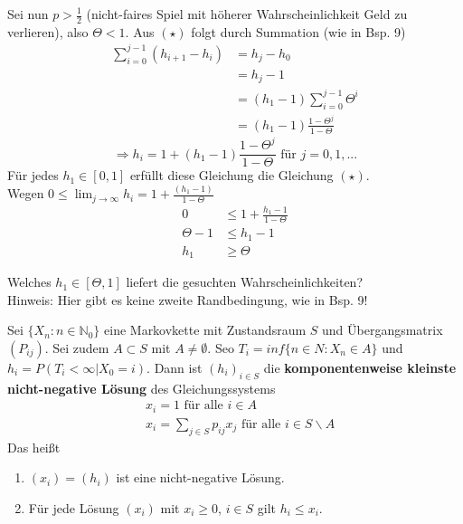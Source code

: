 \documentclass[a4paper,12pt]{article}
\begin{document}
\begin{tcolorbox}[breakable, colframe=blue, colback=white, title=Beispiel 10]
Sei nun $p > \frac{1}{2}$ (nicht-faires Spiel mit höherer Wahrscheinlichkeit Geld zu verlieren), also $\Theta < 1$.
Aus $(\star)$ folgt durch Summation (wie in Bsp. 9)
\begin{align*}
\sum_{i=0}^{j-1}(h_{i+1} - h_i) & = h_j - h_0 \\
& = h_j - 1 \\
& = (h_1-1)\sum_{i=0}^{j-1}\Theta^{i}\\
& = (h_1 - 1)\frac{1- \Theta^{j}}{1- \Theta}
\end{align*}
$$
\Rightarrow h_i = 1 + (h_1 - 1)\frac{1- \Theta^{j}}{1- \Theta} \text{ für } j = 0, 1, ...
$$
Für jedes $h_1 \in [0,1]$ erfüllt diese Gleichung die Gleichung $(\star)$.\\
Wegen $0 \leq \lim_{j \to \infty}h_i = 1 + \frac{(h_1 - 1)}{1 - \Theta}$ 
\begin{align*}
0 &\leq 1+ \frac{h_1 - 1}{1- \Theta}\\
\Theta - 1 & \leq h_1 - 1 \\
h_1 &\geq \Theta
\end{align*}


Welches $h_1 \in [\Theta, 1]$ liefert die gesuchten Wahrscheinlichkeiten?\\

Hinweis: Hier gibt es keine zweite Randbedingung, wie in Bsp. 9!
\end{tcolorbox}


\begin{tcolorbox}[breakable, colframe=green, colback=white, title=Satz 11]
Sei $\{X_n: n \in \mathbb{N}_0\}$ eine Markovkette mit Zustandsraum $S$ und Übergangsmatrix $(P_{ij})$.
Sei zudem $A \subset S$ mit $A \neq \emptyset$. Seo $T_i = inf\{n \in N: X_n \in A\}$ und
$h_i = P(T_i < \infty | X_0 = i)$.  Dann ist $(h_i)_{i \in S}$ die \textbf{komponentenweise kleinste nicht-negative Lösung} 
des Gleichungssystems
\begin{align*}
	&x_i = 1 \text{ für alle } i \in A\\
	&x_i = \sum_{j \in S}p_{ij}x_j \text{ für alle } i \in S \backslash A
\end{align*}
Das heißt
\begin{enumerate}
	\item $(x_i) = (h_i)$ ist eine nicht-negative Lösung.
	\item Für jede Lösung $(x_i)$ mit $x_i \geq 0$, $i \in S$ gilt $h_i \leq x_i$.
\end{enumerate}
\end{tcolorbox}
\end{document}
